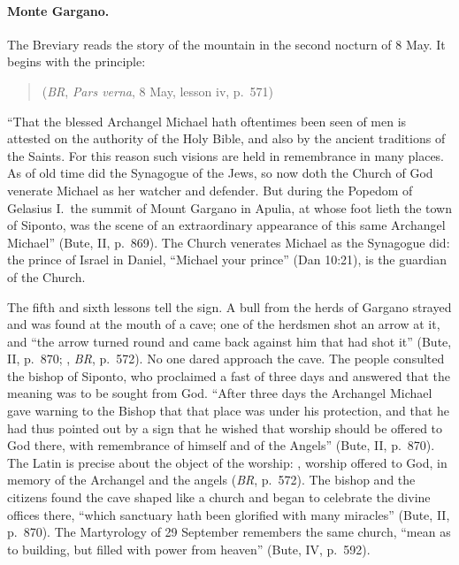 \paragraph{Monte Gargano.} The Breviary reads the story of the mountain
in the second nocturn of 8 May. It begins with the principle:
\begin{quote}
 (\emph{BR}, \emph{Pars verna}, 8 May, lesson
iv, p.~571)
\end{quote}
``That the blessed Archangel Michael hath oftentimes been seen of men is
attested on the authority of the Holy Bible, and also by the ancient
traditions of the Saints. For this reason such visions are held in
remembrance in many places. As of old time did the Synagogue of the Jews,
so now doth the Church of God venerate Michael as her watcher and
defender. But during the Popedom of Gelasius I.\ the summit of Mount
Gargano in Apulia, at whose foot lieth the town of Siponto, was the scene
of an extraordinary appearance of this same Archangel Michael'' (Bute,
II, p.~869). The Church venerates Michael as the Synagogue did: the
prince of Israel in Daniel, ``Michael your prince'' (Dan 10:21), is the
guardian of the Church.

The fifth and sixth lessons tell the sign. A bull from the herds of
Gargano strayed and was found at the mouth of a cave; one of the herdsmen
shot an arrow at it, and ``the arrow turned round and came back against
him that had shot it'' (Bute, II, p.~870; , \emph{BR}, p.~572). No one dared approach
the cave. The people consulted the bishop of Siponto, who proclaimed a
fast of three days and answered that the meaning was to be sought from
God. ``After three days the Archangel Michael gave warning to the Bishop
that that place was under his protection, and that he had thus pointed
out by a sign that he wished that worship should be offered to God there,
with remembrance of himself and of the Angels'' (Bute, II, p.~870). The
Latin is precise about the object of the worship: , worship offered to God, in
memory of the Archangel and the angels (\emph{BR}, p.~572). The bishop and
the citizens found the cave shaped like a church and began to celebrate
the divine offices there, ``which sanctuary hath been glorified with many
miracles'' (Bute, II, p.~870). The Martyrology of 29 September remembers
the same church, ``mean as to building, but filled with power from
heaven'' (Bute, IV, p.~592).

